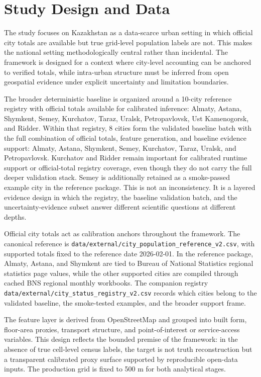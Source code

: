 \section{Study Design and Data}

The study focuses on Kazakhstan as a data-scarce urban setting in which official city totals are available but true grid-level population labels are not. This makes the national setting methodologically central rather than incidental. The framework is designed for a context where city-level accounting can be anchored to verified totals, while intra-urban structure must be inferred from open geospatial evidence under explicit uncertainty and limitation boundaries.

The broader deterministic baseline is organized around a 10-city reference registry with official totals available for calibrated inference: Almaty, Astana, Shymkent, Semey, Kurchatov, Taraz, Uralsk, Petropavlovsk, Ust Kamenogorsk, and Ridder. Within that registry, 8 cities form the validated baseline batch with the full combination of official totals, feature generation, and baseline evidence support: Almaty, Astana, Shymkent, Semey, Kurchatov, Taraz, Uralsk, and Petropavlovsk. Kurchatov and Ridder remain important for calibrated runtime support or official-total registry coverage, even though they do not carry the full deeper validation stack. Semey is additionally retained as a smoke-passed example city in the reference package. This is not an inconsistency. It is a layered evidence design in which the registry, the baseline validation batch, and the uncertainty-evidence subset answer different scientific questions at different depths.

Official city totals act as calibration anchors throughout the framework. The canonical reference is \texttt{data/external/city\_population\_reference\_v2.csv}, with supported totals fixed to the reference date 2026-02-01. In the reference package, Almaty, Astana, and Shymkent are tied to Bureau of National Statistics regional statistics page values, while the other supported cities are compiled through cached BNS regional monthly workbooks. The companion registry \texttt{data/external/city\_status\_registry\_v2.csv} records which cities belong to the validated baseline, the smoke-tested examples, and the broader support frame.

The feature layer is derived from OpenStreetMap and grouped into built form, floor-area proxies, transport structure, and point-of-interest or service-access variables. This design reflects the bounded premise of the framework: in the absence of true cell-level census labels, the target is not truth reconstruction but a transparent calibrated proxy surface supported by reproducible open-data inputs. The production grid is fixed to 500 m for both analytical stages.

